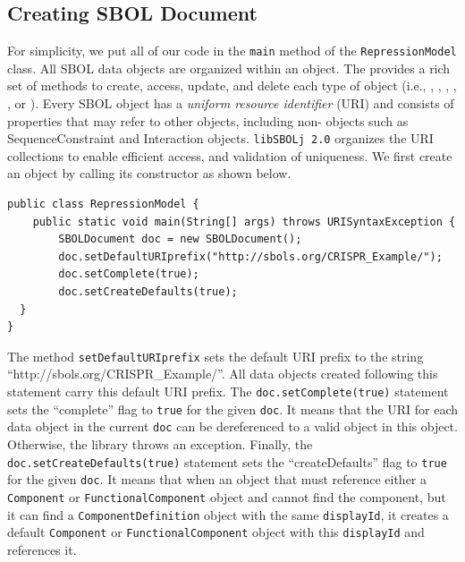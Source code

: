\subsection*{Creating SBOL Document}
For simplicity, we put all of our code in the \lstinline+main+ method of the \lstinline+RepressionModel+ class. All SBOL data objects are organized within an  object. The  provides a rich set of methods to create, access, update, and delete each type of  object (i.e., , , , , , or ). Every SBOL object has a \emph{uniform resource identifier} (URI) and consists of properties that may refer to other objects, including non- objects such as SequenceConstraint and Interaction objects. \texttt{libSBOLj 2.0} organizes the URI collections to enable efficient access, and validation of uniqueness. We first create an  object by calling its constructor as shown below.

\begin{minipage}{0.95\textwidth} 
\begin{lstlisting}
public class RepressionModel {
	public static void main(String[] args) throws URISyntaxException {
		SBOLDocument doc = new SBOLDocument();
		doc.setDefaultURIprefix("http://sbols.org/CRISPR_Example/");
		doc.setComplete(true);
		doc.setCreateDefaults(true);
  }
}
\end{lstlisting}
\end{minipage}

The method \lstinline+setDefaultURIprefix+ sets the
default URI prefix to the string ``http://sbols.org/CRISPR\_Example/''. All data objects created following this statement carry this default URI prefix.  The \lstinline+doc.setComplete(true)+ statement sets the ``complete'' flag to \lstinline+true+ for the given \lstinline+doc+. It means that the URI for each data object in the current \lstinline+doc+ can be dereferenced to a valid object in this  object. Otherwise, the library throws an exception. Finally, the \lstinline+doc.setCreateDefaults(true)+ statement
sets the ``createDefaults'' flag to \lstinline+true+ for the given
\lstinline+doc+.  It means that when an object that must
reference either a \lstinline+Component+ or \lstinline+FunctionalComponent+ object and cannot find the component, but it can find a \lstinline+ComponentDefinition+ object
with the same \lstinline+displayId+, it creates a default \lstinline+Component+ or \lstinline+FunctionalComponent+ object with this \lstinline+displayId+ and references it.

